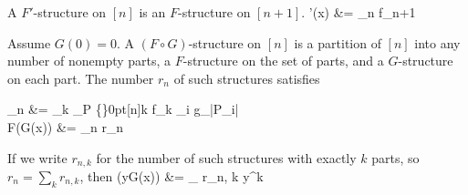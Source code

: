 \documentclass[11pt,a4paper]{article}
\def\[#1\]{\begin{align*}#1\end{align*}}
\DeclareRobustCommand{\stirling}{\genfrac\{\}{0pt}{}}
\begin{document}
A $F'$-structure on $[n]$ is an $F$-structure on $[n+1]$.
\[
F'(x) &= \sum_{n } f_{n+1} 
\]

Assume $G(0) = 0$.  A $(F \circ G)$-structure on $[n]$ is a partition of $[n]$ into any number of nonempty parts, a $F$-structure on the set of parts, and a $G$-structure on each part.  The number $r_n$ of such structures satisfies

\[
r_n &= \sum_k \sum_{P \in \stirling{[n]}{k}} f_k \prod_{i \in [k]} g_{|P_i|} \\
F(G(x)) &= \sum_{n } r_n 
\]

If we write $r_{n, k}$ for the number of such structures with exactly $k$ parts, so $r_n = \sum_k r_{n, k}$, then
\[
F(yG(x)) &= \sum_{} r_{n, k} y^k
\]
\end{document}
